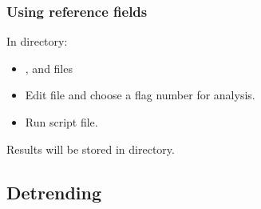 \begin{frame}
\frametitle{Using reference fields}

\centerline{In  directory:}

\begin{itemize}
\item {},  and  files
\item Edit  file and choose a flag number for analysis.
\item Run  script file.
\end{itemize}

\vfill

Results will be stored in  directory.


\end{frame}

\subsection{Detrending}



